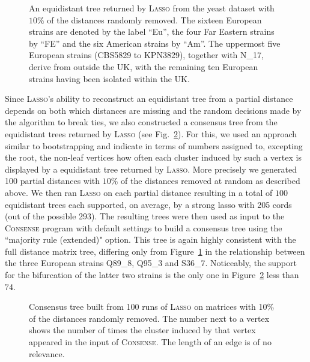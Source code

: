 \begin{figure}
  \centering
  \begin{tikzpicture}[xscale=50,yscale=0.35]
    
  \end{tikzpicture}
  \endpgfgraphicnamed
  \caption{An equidistant tree returned by \textsc{Lasso} from the yeast
    dataset with $10\%$ of the distances randomly removed. The sixteen
    European strains are denoted by the label ``Eu'', the four Far Eastern
    strains by ``FE'' and the six American strains by ``Am''. The uppermost
    five European strains (CBS5829 to KPN3829), together with N\_17, derive
    from outside the UK, with the remaining ten European strains having been
    isolated within the UK.}
  \label{fig:yeast-tree-complete}
\end{figure}

Since \textsc{Lasso}'s ability to reconstruct an equidistant tree from a
partial distance depends on both which distances are missing and the random
decisions made by the algorithm to break ties, we also constructed a consensus
tree from the equidistant trees returned by \textsc{Lasso} (see
Fig.~\ref{fig:yeast-tree-consense}).  For this, we used an approach similar to
bootstrapping and indicate in terms of numbers assigned to, excepting the
root, the non-leaf vertices how often each cluster induced by such a vertex is
displayed by a equidistant tree returned by \textsc{Lasso}.  More precisely we
generated 100 partial distances with $10\%$ of the distances removed at random
as described above.  We then ran \textsc{Lasso} on each partial distance
resulting in a total of $100$ equidistant trees each supported, on average, by
a strong lasso with 205 cords (out of the possible 293).  The resulting trees
were then used as input to the \textsc{Consense} program
\cite{felsenstein1993phylip} with default settings to build a consensus tree
using the ``majority rule (extended)" option. This tree is again highly
consistent with the full distance matrix tree, differing only from
Figure~\ref{fig:yeast-tree-complete} in the relationship between the three
European strains Q89\_8, Q95\_3 and S36\_7. Noticeably, the support for the
bifurcation of the latter two strains is the only one in
Figure~\ref{fig:yeast-tree-consense} less than 74.

\begin{figure}
  \centering
  \begin{tikzpicture}[xscale=0.8,yscale=0.35]
    
  \end{tikzpicture}
  \endpgfgraphicnamed
  \caption{Consensus tree built from 100 runs of \textsc{Lasso} on matrices
    with 10\% of the distances randomly removed.  The number next to a vertex
    shows the number of times the cluster induced by that vertex appeared in
    the input of \textsc{Consense}. The length of an edge is of no relevance.}
  \label{fig:yeast-tree-consense}
\end{figure}

